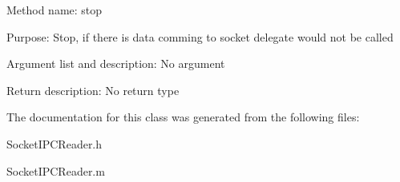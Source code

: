 \begin{DoxyItemize}
\item \-Method name\-: stop
\item \-Purpose\-: \-Stop, if there is data comming to socket delegate would not be called
\item \-Argument list and description\-: \-No argument
\item \-Return description\-: \-No return type 
\end{DoxyItemize}

\-The documentation for this class was generated from the following files\-:\begin{DoxyCompactItemize}
\item 
\-Socket\-I\-P\-C\-Reader.\-h\item 
\-Socket\-I\-P\-C\-Reader.\-m\end{DoxyCompactItemize}
